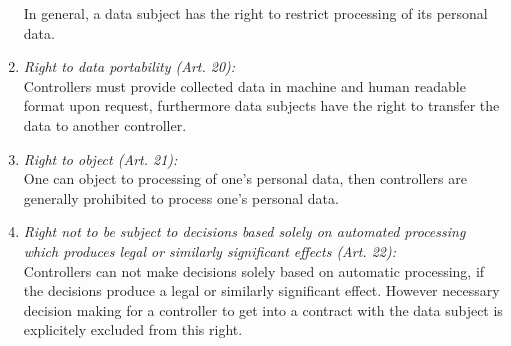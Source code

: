 \documentclass[a4paper,12pt]{report}
\begin{document}
\begin{enumerate}[]
		In general, a data subject has the right to restrict processing of its personal data.
		\item \textit{Right to data portability (Art. 20):} \\
		Controllers must provide collected data in machine and human readable format upon request, furthermore data subjects have the right to transfer the data to another controller.
		\item \textit{Right to object (Art. 21):} \\
		One can object to processing of one's personal data, then controllers are generally prohibited to process one's personal data.
		\item \textit{Right not to be subject to decisions based solely on automated processing which produces legal or similarly significant effects (Art. 22):} \\
		Controllers can not make decisions solely based on automatic processing, if the decisions produce a legal or similarly significant effect. 
		However necessary decision making for a controller to get into a contract with the data subject is explicitely excluded from this right.
	\end{enumerate}
	\closesection
\end{document}
